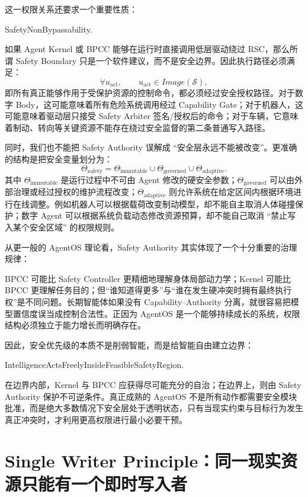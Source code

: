 这一权限关系还要求一个重要性质：
\begin{statementbox}
SafetyNonBypassability.
\end{statementbox}
如果 Agent Kernel 或 BPCC 能够在运行时直接调用低层驱动绕过 RSC，那么所谓 Safety Boundary 只是一个软件建议，而不是安全边界。因此执行路径必须满足：
\[
\forall u_{\mathrm{act}},
\qquad
u_{\mathrm{act}}
\in
Image(\mathcal S),
\]
即所有真正能够作用于受保护资源的控制命令，都必须经过安全授权路径。对于数字 Body，这可能意味着所有危险系统调用经过 Capability Gate；对于机器人，这可能意味着驱动层只接受 Safety Arbiter 签名/授权后的命令；对于车辆，它意味着制动、转向等关键资源不能存在绕过安全监督的第二条普通写入路径。

同时，我们也不能把 Safety Authority 误解成 ``安全层永远不能被改变''。更准确的结构是把安全变量划分为：
\[
\Theta_{\mathrm{safety}}
=
\Theta_{\mathrm{immutable}}
\cup
\Theta_{\mathrm{governed}}
\cup
\Theta_{\mathrm{adaptive}}.
\]
其中 $\Theta_{\mathrm{immutable}}$ 是运行过程中不可由 Agent 修改的硬安全参数；$\Theta_{\mathrm{governed}}$ 可以由外部治理或经过授权的维护流程改变；$\Theta_{\mathrm{adaptive}}$ 则允许系统在给定区间内根据环境进行在线调整。例如机器人可以根据载荷改变制动模型，却不能自主取消人体碰撞保护；数字 Agent 可以根据系统负载动态修改资源预算，却不能自己取消 ``禁止写入某个安全区域'' 的权限规则。

从更一般的 AgentOS 理论看，Safety Authority 其实体现了一个十分重要的治理规律：
\begin{statementbox}
\centering
{}
\end{statementbox}
BPCC 可能比 Safety Controller 更精细地理解身体局部动力学；Kernel 可能比 BPCC 更理解任务目的；但``谁知道得更多''与``谁在发生硬冲突时拥有最终执行权''是不同问题。长期智能体如果没有 Capability--Authority 分离，就很容易把模型置信度误当成控制合法性。正因为 AgentOS 是一个能够持续成长的系统，权限结构必须独立于能力增长而明确存在。

因此，安全优先级的本质不是削弱智能，而是给智能自由建立边界：
\begin{statementbox}
IntelligenceActsFreelyInsideFeasibleSafetyRegion.
\end{statementbox}
在边界内部，Kernel 与 BPCC 应获得尽可能充分的自治；在边界上，则由 Safety Authority 保护不可逆条件。真正成熟的 AgentOS 不是所有动作都需要安全模块批准，而是绝大多数情况下安全层处于透明状态，只有当现实约束与目标行为发生真正冲突时，才利用更高权限进行最小必要干预。

\section{Single Writer Principle：同一现实资源只能有一个即时写入者}

